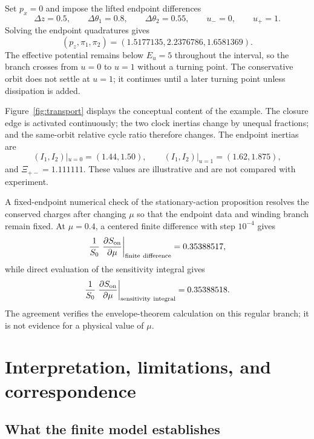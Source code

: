 \documentclass[11pt]{article}
\theoremstyle{plain}
\begin{document}
Set $p_x=0$ and impose the lifted endpoint differences
\begin{equation}
\Delta z=0.5,\qquad\Delta\theta_1=0.8,\qquad\Delta\theta_2=0.55,\qquad u_-=0,\qquad u_+=1.
\end{equation}
Solving the endpoint quadratures gives
\begin{equation}
(p_z,\pi_1,\pi_2)=(1.5177135,2.2376786,1.6581369).
\end{equation}
The effective potential remains below $E_u=5$ throughout the interval, so the branch crosses from $u=0$ to $u=1$ without a turning point. The conservative orbit does not settle at $u=1$; it continues until a later turning point unless dissipation is added.

Figure~\ref{fig:transport} displays the conceptual content of the example. The closure edge is activated continuously; the two clock inertias change by unequal fractions; and the same-orbit relative cycle ratio therefore changes. The endpoint inertias are
\begin{equation}
(I_1,I_2)|_{u=0}=(1.44,1.50),\qquad (I_1,I_2)|_{u=1}=(1.62,1.875),
\end{equation}
and $\Xi_{+-}=1.111111$. These values are illustrative and are not compared with experiment.

A fixed-endpoint numerical check of the stationary-action proposition resolves the conserved charges after changing $\mu$ so that the endpoint data and winding branch remain fixed. At $\mu=0.4$, a centered finite difference with step $10^{-4}$ gives
\begin{equation}
\frac1{S_0}\left.\frac{\partial S_{\rm on}}{\partial\mu}\right|_{\rm finite\ difference}=0.35388517,
\end{equation}
while direct evaluation of the sensitivity integral gives
\begin{equation}
\frac1{S_0}\left.\frac{\partial S_{\rm on}}{\partial\mu}\right|_{\rm sensitivity\ integral}=0.35388518.
\end{equation}
The agreement verifies the envelope-theorem calculation on this regular branch; it is not evidence for a physical value of $\mu$.

\section{Interpretation, limitations, and correspondence}

\subsection{What the finite model establishes}
\end{document}
